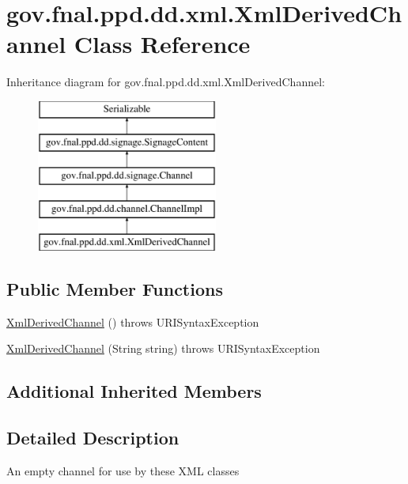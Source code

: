 \hypertarget{classgov_1_1fnal_1_1ppd_1_1dd_1_1xml_1_1XmlDerivedChannel}{\section{gov.\-fnal.\-ppd.\-dd.\-xml.\-Xml\-Derived\-Channel Class Reference}
\label{classgov_1_1fnal_1_1ppd_1_1dd_1_1xml_1_1XmlDerivedChannel}
}
Inheritance diagram for gov.\-fnal.\-ppd.\-dd.\-xml.\-Xml\-Derived\-Channel\-:\begin{figure}[H]
\begin{center}
\leavevmode
\includegraphics[height=5.000000cm]{classgov_1_1fnal_1_1ppd_1_1dd_1_1xml_1_1XmlDerivedChannel}
\end{center}
\end{figure}
\subsection*{Public Member Functions}
\begin{DoxyCompactItemize}
\item 
\hyperlink{classgov_1_1fnal_1_1ppd_1_1dd_1_1xml_1_1XmlDerivedChannel_a99604d4e33cb14128bdadbbeb26e961a}{Xml\-Derived\-Channel} ()  throws U\-R\-I\-Syntax\-Exception 
\item 
\hyperlink{classgov_1_1fnal_1_1ppd_1_1dd_1_1xml_1_1XmlDerivedChannel_a42743783587a2fcfe7ed1eebe5d04299}{Xml\-Derived\-Channel} (String string)  throws U\-R\-I\-Syntax\-Exception 
\end{DoxyCompactItemize}
\subsection*{Additional Inherited Members}


\subsection{Detailed Description}
An empty channel for use by these X\-M\-L classes

